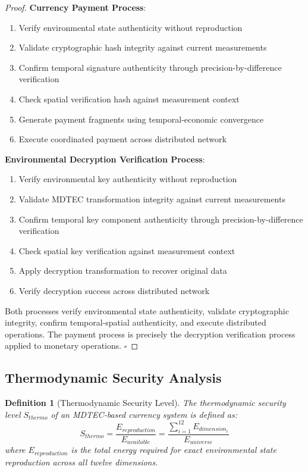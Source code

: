 \documentclass[12pt,a4paper]{article}
\newtheorem{definition}[theorem]{Definition}
\begin{document}
\begin{proof}
\textbf{Currency Payment Process}:
\begin{enumerate}
\item Verify environmental state authenticity without reproduction
\item Validate cryptographic hash integrity against current measurements
\item Confirm temporal signature authenticity through precision-by-difference verification
\item Check spatial verification hash against measurement context
\item Generate payment fragments using temporal-economic convergence
\item Execute coordinated payment across distributed network
\end{enumerate}

\textbf{Environmental Decryption Verification Process}:
\begin{enumerate}
\item Verify environmental key authenticity without reproduction
\item Validate MDTEC transformation integrity against current measurements
\item Confirm temporal key component authenticity through precision-by-difference verification
\item Check spatial key verification against measurement context
\item Apply decryption transformation to recover original data
\item Verify decryption success across distributed network
\end{enumerate}

Both processes verify environmental state authenticity, validate cryptographic integrity, confirm temporal-spatial authenticity, and execute distributed operations. The payment process is precisely the decryption verification process applied to monetary operations. $\square$
\end{proof}

\subsection{Thermodynamic Security Analysis}

\begin{definition}[Thermodynamic Security Level]
The thermodynamic security level $S_{thermo}$ of an MDTEC-based currency system is defined as:
\begin{equation}
S_{thermo} = \frac{E_{reproduction}}{E_{available}} = \frac{\sum_{i=1}^{12} E_{dimension_i}}{E_{universe}}
\end{equation}
where $E_{reproduction}$ is the total energy required for exact environmental state reproduction across all twelve dimensions.
\end{definition}
\end{document}
